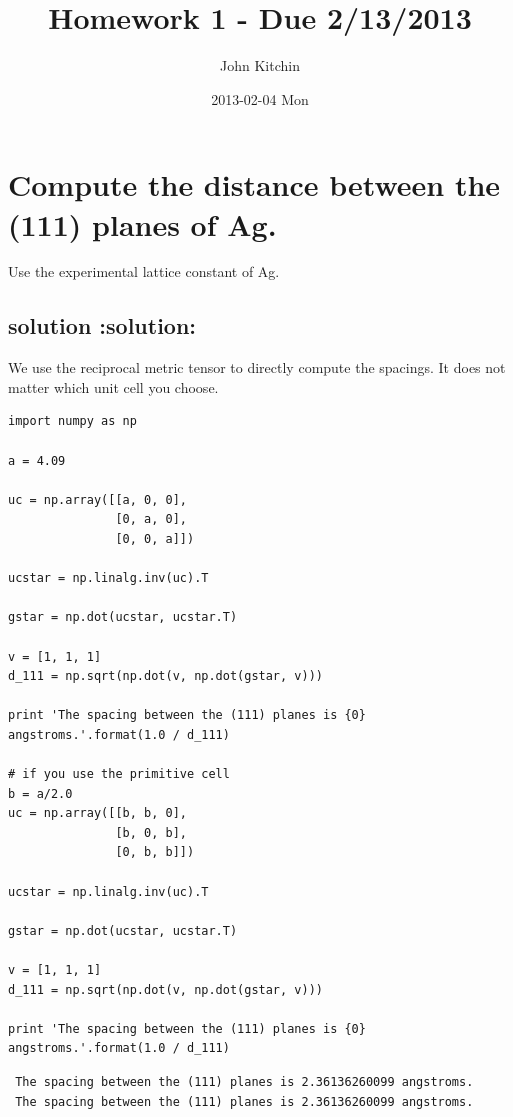 \documentclass{article}
\title{Homework 1 - Due 2/13/2013}
\author{John Kitchin}
\date{2013-02-04 Mon}
\begin{document}
\maketitle

\setcounter{tocdepth}{3}
\tableofcontents
\vspace*{1cm}

\section{Compute the distance between the (111) planes of Ag.}
\label{sec-1}

Use the experimental lattice constant of Ag.
\subsection{solution \textbf{:solution:}}
\label{sec-1-1}

We use the reciprocal metric tensor to directly compute the spacings. It does not matter which unit cell you choose.

\begin{verbatim}
import numpy as np

a = 4.09

uc = np.array([[a, 0, 0],
               [0, a, 0],
               [0, 0, a]])

ucstar = np.linalg.inv(uc).T

gstar = np.dot(ucstar, ucstar.T)

v = [1, 1, 1]
d_111 = np.sqrt(np.dot(v, np.dot(gstar, v)))

print 'The spacing between the (111) planes is {0} angstroms.'.format(1.0 / d_111)

# if you use the primitive cell
b = a/2.0
uc = np.array([[b, b, 0],
               [b, 0, b],
               [0, b, b]])

ucstar = np.linalg.inv(uc).T

gstar = np.dot(ucstar, ucstar.T)

v = [1, 1, 1]
d_111 = np.sqrt(np.dot(v, np.dot(gstar, v)))

print 'The spacing between the (111) planes is {0} angstroms.'.format(1.0 / d_111)
\end{verbatim}

\begin{verbatim}
 The spacing between the (111) planes is 2.36136260099 angstroms.
 The spacing between the (111) planes is 2.36136260099 angstroms.
\end{verbatim}
\end{document}
